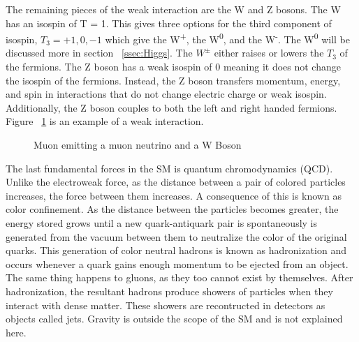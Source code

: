  \indent The remaining pieces of the weak interaction are the W and Z bosons. The W has an isospin of T = 1. This gives three options for the third component of isospin, ${T_{3} = +1, 0, -1}$ which give the W\textsuperscript{+}, the W\textsuperscript{0}, and the W\textsuperscript{-}. The W\textsuperscript{0} will be discussed more in section ~\ref{ssec:Higgs}. The ${W^{\pm}}$ either raises or lowers the ${T_{3}}$ of the fermions. The Z boson has a weak isospin of 0 meaning it does not change the isospin of the fermions. Instead, the Z boson transfers momentum, energy, and spin in interactions that do not change electric charge or weak isospin. Additionally, the Z boson couples to both the left and right handed fermions. Figure ~\ref{Fig:weak_dia} is an example of a weak interaction.\newline

\begin{figure}[h]
\begin{center}

\caption[Muon emitting a neutrino]{Muon emitting a muon neutrino and a W Boson}
\label{Fig:weak_dia}
\end{center}
\end{figure}


The last fundamental forces in the SM is quantum chromodynamics (QCD). %
 Unlike the electroweak force, as the distance between a pair of colored particles increases, the force between them increases. A consequence of this is known as color confinement. As the distance between the particles becomes greater, the energy stored grows until a new quark-antiquark pair is spontaneously is generated from the vacuum between them to neutralize the color of the original quarks. This generation of color neutral hadrons is known as hadronization and occurs whenever a quark gains enough momentum to be ejected from an object. The same thing happens to gluons, as they too cannot exist by themselves. After hadronization, the resultant hadrons produce showers of particles when they interact with dense matter. These showers are recontructed in detectors as objects called jets. \newline
\indent Gravity is outside the scope of the SM and is not explained here.
